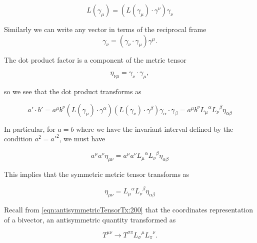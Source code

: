 \begin{equation}\label{eqn:antisymmetricTensorTx:330}
L(\gamma_\mu) = \left( L(\gamma_\mu) \cdot \gamma^\nu \right) \gamma_\nu
\end{equation}

Similarly we can write any vector in terms of the reciprocal frame
\begin{equation}\label{eqn:antisymmetricTensorTx:340}
\gamma_\nu = (\gamma_\nu \cdot \gamma_\mu) \gamma^\mu.
\end{equation}

The dot product factor is a component of the metric tensor

\begin{equation}\label{eqn:antisymmetricTensorTx:350}
\eta_{\nu \mu} = \gamma_\nu \cdot \gamma_\mu,
\end{equation}

so we see that the dot product transforms as

\begin{equation}\label{eqn:antisymmetricTensorTx:320b}
a' \cdot b' 
= a^\mu b^\nu 
( L(\gamma_\mu) \cdot \gamma^\alpha ) 
( L(\gamma_\nu) \cdot \gamma^\beta ) 
\gamma_\alpha
\cdot
\gamma_\beta
= a^\mu b^\nu 
{L_\mu}^\alpha
{L_\nu}^\beta
\eta_{\alpha \beta}
\end{equation}

In particular, for $a = b$ where we have the invariant interval defined by the condition $a^2 = {a'}^2$, we must have

\begin{equation}\label{eqn:antisymmetricTensorTx:360}
a^\mu a^\nu \eta_{\mu \nu}
= a^\mu a^\nu 
{L_\mu}^\alpha
{L_\nu}^\beta
\eta_{\alpha \beta}
\end{equation}

This implies that the symmetric metric tensor transforms as

\begin{equation}\label{eqn:antisymmetricTensorTx:370}
\eta_{\mu\nu}
=
{L_\mu}^\alpha
{L_\nu}^\beta
\eta_{\alpha \beta}
\end{equation}

Recall from \ref{eqn:antisymmetricTensorTx:200} that the coordinates representation of a bivector, an antisymmetric quantity transformed as

\begin{equation}\label{eqn:antisymmetricTensorTx:200b}
T^{\mu \nu} \rightarrow T^{\sigma \pi} {L_\sigma}^\mu {L_\pi}^\nu.
\end{equation}

